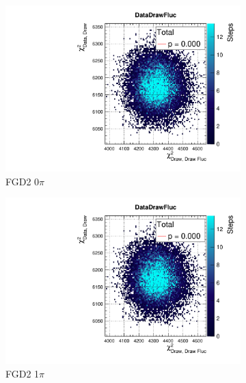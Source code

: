 \begin{figure}[h]
	\begin{subfigure}[t]{0.32\textwidth}
		\includegraphics[width=\textwidth, trim={20mm 6mm 4mm 11mm}, clip,page=34]{figures/mach3/2018/data/2018a_FixedCov_RedCov_Mpi_Data_merge_PostPredStore_FullLLH_procs}
		\caption{FGD2 0$\pi$}
	\end{subfigure}
	\begin{subfigure}[t]{0.32\textwidth}
		\includegraphics[width=\textwidth, trim={20mm 6mm 4mm 11mm}, clip,page=43]{figures/mach3/2018/data/2018a_FixedCov_RedCov_Mpi_Data_merge_PostPredStore_FullLLH_procs}
		\caption{FGD2 1$\pi$}
	\end{subfigure}
	\begin{subfigure}[t]{0.32\textwidth}

\end{subfigure}
\end{figure}
